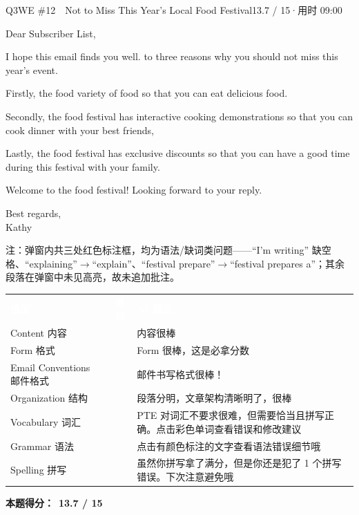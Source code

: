 \begin{qblock}{Q3\quad WE \#12\ \ Not to Miss This Year's Local Food Festival}{13.7 / 15\quad·\quad 用时 09:00}
\begin{youbox}
Dear Subscriber List,

I hope this email finds you well.  to  three reasons why you should not miss this year's event.

Firstly, the food  variety of food so that you can eat delicious food.

Secondly, the food festival has interactive cooking demonstrations so that you can cook dinner with your best friends,

Lastly, the food festival has exclusive discounts so that you can have a good time during this festival with your family.

Welcome to the food festival! Looking forward to your reply.

Best regards,\\ Kathy
\end{youbox}
{\footnotesize\color{gray} 注：弹窗内共三处红色标注框，均为语法/缺词类问题——``I'm writing'' 缺空格、``explaining''$\to$``explain''、``festival prepare''$\to$``festival prepares a''；其余段落在弹窗中未见高亮，故未追加批注。}

{\small\scorehead
\begin{tabularx}{\linewidth}{l c Y}
\textcolor{white}{\bfseries 维度} & \textcolor{white}{\bfseries 得分} & \textcolor{white}{\bfseries AI 建议}\\
Content 内容              &    & 内容很棒\\
Form 格式                &    & Form 很棒，这是必拿分数\\
Email Conventions 邮件格式 &    & 邮件书写格式很棒！\\
Organization 结构         &    & 段落分明，文章架构清晰明了，很棒\\
Vocabulary 词汇           &  & PTE 对词汇不要求很难，但需要恰当且拼写正确。点击彩色单词查看错误和修改建议\\
Grammar 语法              &  & 点击有颜色标注的文字查看语法错误细节哦~\\
Spelling 拼写             &    & 虽然你拼写拿了满分，但是你还是犯了 1 个拼写错误。下次注意避免哦\\
\end{tabularx}}
\smallskip
\textbf{本题得分：}\ {\color{cAccent}\bfseries 13.7 / 15}

\end{qblock}

